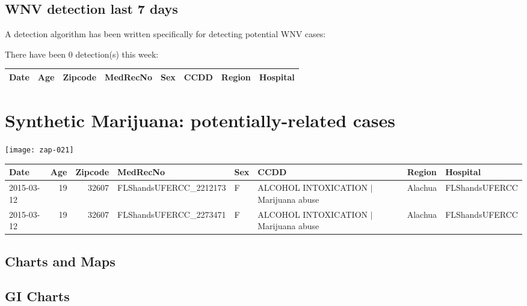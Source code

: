 \documentclass[12pt]{article}
\begin{document}
\subsection*{WNV detection last 7 days}

A detection algorithm has been written specifically for detecting potential WNV cases:

There have been 0 detection(s) this week:

\begin{table}[H]
\begin{table}[ht]
\centering
{\tiny
\begin{tabular}{rrrlllll}
  \hline
Date & Age & Zipcode & MedRecNo & Sex & CCDD & Region & Hospital \\ 
  \hline
\hline
\end{tabular}
}
\end{table}\end{table}


\section*{Synthetic Marijuana: potentially-related cases}


\texttt{[image: zap-021]}


\begin{table}[H]
\begin{table}[ht]
\centering
{\tiny
\begin{tabular}{lrrlllll}
  \hline
Date & Age & Zipcode & MedRecNo & Sex & CCDD & Region & Hospital \\ 
  \hline
2015-03-12 &  19 & 32607 & FLShandsUFERCC\_2212173 & F & ALCOHOL INTOXICATION $|$ Marijuana abuse & Alachua & FLShandsUFERCC \\ 
  2015-03-12 &  19 & 32607 & FLShandsUFERCC\_2273471 & F & ALCOHOL INTOXICATION $|$ Marijuana abuse & Alachua & FLShandsUFERCC \\ 
   \hline
\end{tabular}
}
\end{table}\end{table}


\begin{center}

\section*{Charts and Maps}
\subsection*{GI Charts}
\end{center}
\end{document}

